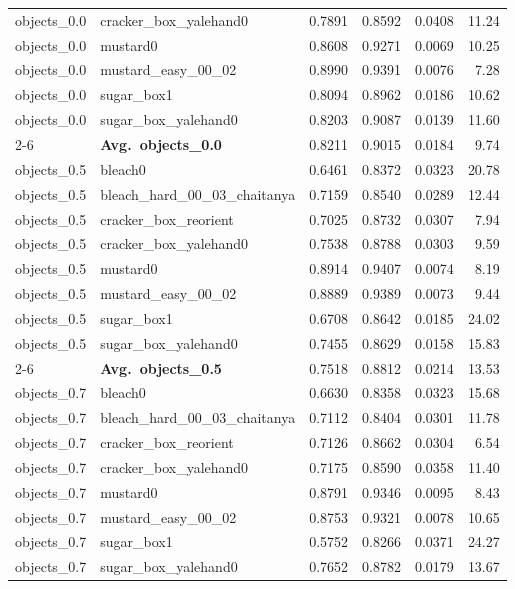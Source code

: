 \begin{longtable}{llrrrr}
  objects_0.0 & cracker\_box\_yalehand0 & 0.7891 & 0.8592 & 0.0408 & 11.24 \\
  objects_0.0 & mustard0 & 0.8608 & 0.9271 & 0.0069 & 10.25 \\
  objects_0.0 & mustard\_easy\_00\_02 & 0.8990 & 0.9391 & 0.0076 & 7.28 \\
  objects_0.0 & sugar\_box1 & 0.8094 & 0.8962 & 0.0186 & 10.62 \\
  objects_0.0 & sugar\_box\_yalehand0 & 0.8203 & 0.9087 & 0.0139 & 11.60 \\
  \cmidrule{2-6}
  & \textbf{Avg.~objects_0.0} & 0.8211 & 0.9015 & 0.0184 & 9.74 \\
  \midrule
  objects_0.5 & bleach0 & 0.6461 & 0.8372 & 0.0323 & 20.78 \\
  objects_0.5 & bleach\_hard\_00\_03\_chaitanya & 0.7159 & 0.8540 & 0.0289 & 12.44 \\
  objects_0.5 & cracker\_box\_reorient & 0.7025 & 0.8732 & 0.0307 & 7.94 \\
  objects_0.5 & cracker\_box\_yalehand0 & 0.7538 & 0.8788 & 0.0303 & 9.59 \\
  objects_0.5 & mustard0 & 0.8914 & 0.9407 & 0.0074 & 8.19 \\
  objects_0.5 & mustard\_easy\_00\_02 & 0.8889 & 0.9389 & 0.0073 & 9.44 \\
  objects_0.5 & sugar\_box1 & 0.6708 & 0.8642 & 0.0185 & 24.02 \\
  objects_0.5 & sugar\_box\_yalehand0 & 0.7455 & 0.8629 & 0.0158 & 15.83 \\
  \cmidrule{2-6}
  & \textbf{Avg.~objects_0.5} & 0.7518 & 0.8812 & 0.0214 & 13.53 \\
  \midrule
  objects_0.7 & bleach0 & 0.6630 & 0.8358 & 0.0323 & 15.68 \\
  objects_0.7 & bleach\_hard\_00\_03\_chaitanya & 0.7112 & 0.8404 & 0.0301 & 11.78 \\
  objects_0.7 & cracker\_box\_reorient & 0.7126 & 0.8662 & 0.0304 & 6.54 \\
  objects_0.7 & cracker\_box\_yalehand0 & 0.7175 & 0.8590 & 0.0358 & 11.40 \\
  objects_0.7 & mustard0 & 0.8791 & 0.9346 & 0.0095 & 8.43 \\
  objects_0.7 & mustard\_easy\_00\_02 & 0.8753 & 0.9321 & 0.0078 & 10.65 \\
  objects_0.7 & sugar\_box1 & 0.5752 & 0.8266 & 0.0371 & 24.27 \\
  objects_0.7 & sugar\_box\_yalehand0 & 0.7652 & 0.8782 & 0.0179 & 13.67 \\

\end{longtable}
